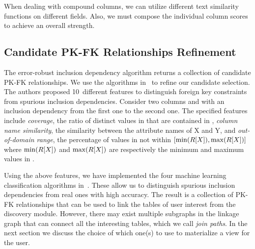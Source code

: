 When dealing with compound columns, we can utilize different text similarity functions on different fields. 
Also, we must compose the individual column scores to achieve an overall strength.


\subsection{Candidate PK-FK Relationships Refinement}
\label{subsec:refine}


The error-robust inclusion dependency algorithm returns a collection of candidate PK-FK relationships.
We use the algorithms in~\cite{DBLP:conf/webdb/RostinABNL09} 
to refine our candidate selection. The authors proposed 10~different features to distinguish foreign key constraints from spurious inclusion dependencies. Consider two columns \RX and \SY with an inclusion dependency from the first one to the second one. 
The specified features include 
\emph{coverage}, the ratio of distinct values in \RX that are contained in \SY, 
\emph{column name similarity}, the similarity between the attribute names of X and Y, 
and \emph{out-of-domain range}, the percentage of values in \SY not within $[\min(R[X]), \max(R[X])]$ where $\min(R[X])$ and $\max(R[X])$ are respectively the minimum and maximum values in \RX.

Using the above features, we have implemented the four machine learning classification algorithms in~\cite{DBLP:conf/webdb/RostinABNL09}. These allow us to distinguish spurious inclusion dependencies from real ones  with high accuracy.
The result is a collection of PK-FK relationships that can be used to link the tables of user interest from the discovery module. However, there may exist multiple subgraphs in the linkage graph that can connect all the interesting tables, which we call \emph{join paths}. In the next section we discuss the choice of which one(s) to use to materialize a view for the user.


